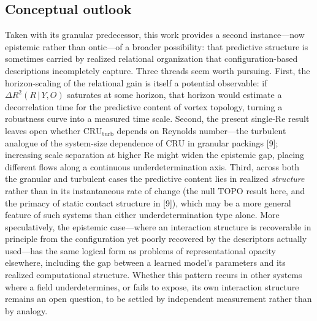 \documentclass[11pt,a4paper]{article}
\begin{document}
\subsection{Conceptual outlook}
Taken with its granular predecessor, this work provides a second instance---now epistemic rather than ontic---of a broader possibility: that predictive structure is sometimes carried by realized relational organization that configuration-based descriptions incompletely capture. Three threads seem worth pursuing. First, the horizon-scaling of the relational gain is itself a potential observable: if $\Delta R^2(R\,|\,Y,O)$ saturates at some horizon, that horizon would estimate a decorrelation time for the predictive content of vortex topology, turning a robustness curve into a measured time scale. Second, the present single-$\mathrm{Re}$ result leaves open whether $\mathrm{CRU}_{\text{turb}}$ depends on Reynolds number---the turbulent analogue of the system-size dependence of $\mathrm{CRU}$ in granular packings [9]; increasing scale separation at higher $\mathrm{Re}$ might widen the epistemic gap, placing different flows along a continuous underdetermination axis. Third, across both the granular and turbulent cases the predictive content lies in realized \emph{structure} rather than in its instantaneous rate of change (the null $\mathrm{TOPO}$ result here, and the primacy of static contact structure in [9]), which may be a more general feature of such systems than either underdetermination type alone. More speculatively, the epistemic case---where an interaction structure is recoverable in principle from the configuration yet poorly recovered by the descriptors actually used---has the same logical form as problems of representational opacity elsewhere, including the gap between a learned model's parameters and its realized computational structure. Whether this pattern recurs in other systems where a field underdetermines, or fails to expose, its own interaction structure remains an open question, to be settled by independent measurement rather than by analogy.

\end{document}
